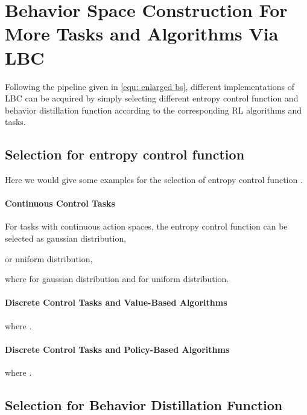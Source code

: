 \clearpage
















\section{Behavior Space Construction For More Tasks and Algorithms Via LBC}
\label{Sec: appendix behavior space}
Following the pipeline given in \eqref{equ: enlarged bs}, different implementations of LBC can be acquired by simply selecting different entropy control function  and behavior distillation function  according to the corresponding RL algorithms and tasks. 

\subsection{Selection for entropy control function}
Here we would give some examples for the selection of entropy control function .

\paragraph{Continuous Control Tasks} For tasks with continuous action spaces, the entropy control function can be selected as gaussian distribution, \ie

or uniform distribution, \ie

where  for gaussian distribution and  for uniform distribution.

\paragraph{Discrete Control Tasks and Value-Based Algorithms}

where .

\paragraph{Discrete Control Tasks and Policy-Based Algorithms}

where .

\subsection{Selection for Behavior Distillation Function}
